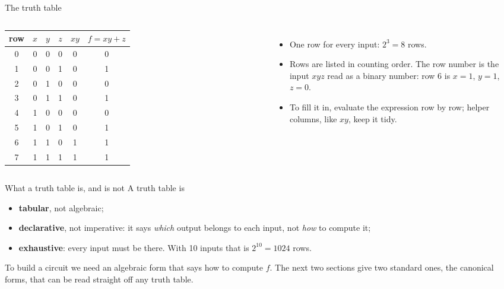 \documentclass[10pt]{wosm-slides}
\begin{document}
\begin{frame}{The truth table}
  \begin{columns}[T, totalwidth=\textwidth]
      \centering
      \begin{tabular}{@{}c|ccc|c|c@{}}
        row & $x$ & $y$ & $z$ & $xy$ & $f = xy + z$ \\
        \midrule
        0 & 0 & 0 & 0 & 0 & 0 \\
        1 & 0 & 0 & 1 & 0 & 1 \\
        2 & 0 & 1 & 0 & 0 & 0 \\
        3 & 0 & 1 & 1 & 0 & 1 \\
        4 & 1 & 0 & 0 & 0 & 0 \\
        5 & 1 & 0 & 1 & 0 & 1 \\
        6 & 1 & 1 & 0 & 1 & 1 \\
        7 & 1 & 1 & 1 & 1 & 1 \\
      \end{tabular}
      \begin{itemize}
        \item One row for every input: $2^3 = 8$ rows.
        \item Rows are listed in counting order. The \alert{row number} is the input
          $xyz$ read as a binary number: row 6 is $x = 1$, $y = 1$, $z = 0$.
        \item To fill it in, evaluate the expression row by row; helper columns,
          like $xy$, keep it tidy.
      \end{itemize}
  \end{columns}
\end{frame}

\begin{frame}{What a truth table is, and is not}
  A truth table is
  \begin{itemize}
    \item \textbf{tabular}, not algebraic;
    \item \textbf{declarative}, not imperative: it says \emph{which} output belongs to
      each input, not \emph{how} to compute it;
    \item \textbf{exhaustive}: every input must be there. With 10 inputs that is
      $2^{10} = 1024$ rows.
  \end{itemize}

  \bigskip
  To build a circuit we need an algebraic form that says how to compute $f$. The
  next two sections give two standard ones, the \alert{canonical} forms, that can
  be read straight off any truth table.
\end{frame}
\end{document}
